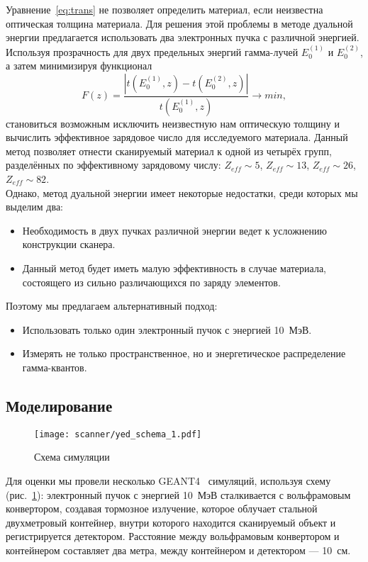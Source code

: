 Уравнение~\ref{eq:trans} не позволяет определить материал, если неизвестна оптическая толщина материала. Для решения этой проблемы в методе дуальной энергии предлагается использовать два электронных пучка с различной энергией. Используя прозрачность для двух предельных энергий гамма-лучей $E^{(1)}_0$ и $E^{(2)}_0$, а затем минимизируя функционал
\begin{equation}
F(z) = \frac{|t(E^{(1)}_0,z) - t(E^{(2)}_0,z)|}{t(E^{(1)}_0,z)} \to min,
\end{equation}
становиться возможным исключить неизвестную нам оптическую толщину и вычислить эффективное зарядовое число для исследуемого материала. Данный метод позволяет отнести сканируемый материал к одной из четырёх групп, разделённых по эффективному зарядовому числу: $Z_{eff} \sim 5$, $Z_{eff} \sim 13$, $Z_{eff} \sim 26$, $Z_{eff} \sim 82$.\\
Однако, метод дуальной энергии имеет некоторые недостатки, среди которых мы выделим два:
\begin{itemize}
    \item Необходимость в двух пучках различной энергии ведет к усложнению конструкции сканера.
    \item Данный метод будет иметь малую эффективность в случае материала, состоящего из сильно различающихся по заряду элементов.
\end{itemize}
Поэтому мы предлагаем альтернативный подход:
\begin{itemize}
    \item Использовать только один электронный пучок с энергией 10~МэВ.
    \item Измерять не только пространственное, но и энергетическое распределение гамма-квантов.
\end{itemize}

\subsection{Моделирование}
\begin{figure}[t]
    \begin{center}
        \texttt{[image: scanner/yed\_schema\_1.pdf]}
        \caption{Схема симуляции}
    \end{center}
    \label{pic:schema1}
\end{figure}
Для оценки мы провели несколько GEANT4~\cite{Geant2016, Geant2006, Geant2003} симуляций, используя схему (рис.~\ref{pic:schema1}): электронный пучок с энергией 10~МэВ сталкивается с вольфрамовым конвертором, создавая тормозное излучение, которое облучает стальной двухметровый контейнер, внутри которого находится сканируемый объект и регистрируется детектором. Расстояние между вольфрамовым конвертором и контейнером составляет два метра, между контейнером и детектором --- 10~см.

